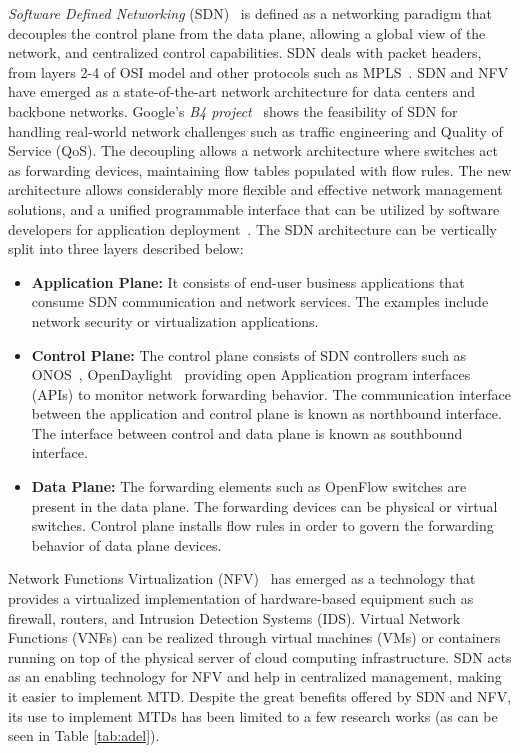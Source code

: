 \emph{Software Defined Networking} (SDN)~ is defined as a networking paradigm that decouples the control plane from the data plane, allowing a global view of the network, and centralized control capabilities. SDN deals with packet headers, from layers 2-4 of OSI model and other protocols such as MPLS~. SDN and NFV have emerged as a state-of-the-art network architecture for data centers and backbone networks. Google's \textit{B4 project}~ shows the feasibility of SDN for handling real-world network challenges such as traffic engineering and Quality of Service (QoS).
The decoupling allows a network architecture where switches act as forwarding devices, maintaining flow tables populated with flow rules. The new architecture allows considerably more flexible and effective network management solutions, and a unified programmable interface that can be utilized by software developers for application deployment~. 
   The SDN architecture can be vertically split into three layers described below: 
  \begin{itemize}
    \item \textbf{Application Plane:} It consists of end-user business applications that consume SDN communication and network services. The examples include network security or virtualization applications.  
    \item \textbf{Control Plane:} The control plane consists of SDN controllers such as ONOS~, OpenDaylight~ providing open Application program interfaces (APIs) to monitor network forwarding behavior. The communication interface between the application and control plane is known as northbound interface. The interface between control and data plane is known as southbound interface.  
    \item \textbf{Data Plane:} The forwarding elements such as OpenFlow switches are present in the data plane. The forwarding devices can be physical or virtual switches. Control plane installs flow rules in order to govern the forwarding behavior of data plane devices. 
    \end{itemize}
  Network Functions Virtualization (NFV)~ has emerged as a technology that provides a virtualized implementation of hardware-based equipment such as firewall, routers, and Intrusion Detection Systems (IDS). Virtual Network Functions (VNFs) can be realized through virtual machines (VMs) or containers running on top of the physical server of cloud computing infrastructure. SDN acts as an enabling technology for NFV and help in centralized management, making it easier to implement MTD. Despite the great benefits offered by SDN and NFV, its use to implement MTDs has been limited to a few research works (as can be seen in Table \ref{tab:adel}).

